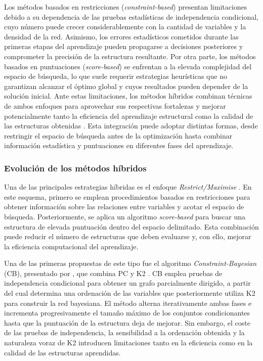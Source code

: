 Los métodos basados en restricciones (\textit{constraint-based}) presentan limitaciones debido a su dependencia de las pruebas estadísticas de independencia condicional, cuyo número puede crecer considerablemente con la cantidad de variables y la densidad de la red. Asimismo, los errores estadísticos cometidos durante las primeras etapas del aprendizaje pueden propagarse a decisiones posteriores y comprometer la precisión de la estructura resultante. Por otra parte, los métodos basados en puntuaciones (\textit{score-based}) se enfrentan a la elevada complejidad del espacio de búsqueda, lo que suele requerir estrategias heurísticas que no garantizan alcanzar el óptimo global y cuyos resultados pueden depender de la solución inicial. Ante estas limitaciones, los métodos híbridos combinan técnicas de ambos enfoques para aprovechar sus respectivas fortalezas y mejorar potencialmente tanto la eficiencia del aprendizaje estructural como la calidad de las estructuras obtenidas \citep{kitson2023survey}. Esta integración puede adoptar distintas formas, desde restringir el espacio de búsqueda antes de la optimización hasta combinar información estadística y puntuaciones en diferentes fases del aprendizaje.

\subsubsection{Evolución de los métodos híbridos}

Una de las principales estrategias híbridas es el enfoque \textit{Restrict/Maximise} \citep{kitson2023survey}. En este esquema, primero se emplean procedimientos basados en restricciones para obtener información sobre las relaciones entre variables y acotar el espacio de búsqueda. Posteriormente, se aplica un algoritmo \textit{score-based} para buscar una estructura de elevada puntuación dentro del espacio delimitado. Esta combinación puede reducir el número de estructuras que deben evaluarse y, con ello, mejorar la eficiencia computacional del aprendizaje.

Una de las primeras propuestas de este tipo fue el algoritmo \textit{Constraint-Bayesian} (CB), presentado por \citet{SINGH1993259}, que combina PC y K2 \citep{Cooper1992K2}. CB emplea pruebas de independencia condicional para obtener un grafo parcialmente dirigido, a partir del cual determina una ordenación de las variables que posteriormente utiliza K2 para construir la red bayesiana. El método alterna iterativamente ambas fases e incrementa progresivamente el tamaño máximo de los conjuntos condicionantes hasta que la puntuación de la estructura deja de mejorar. Sin embargo, el coste de las pruebas de independencia, la sensibilidad a la ordenación obtenida y la naturaleza voraz de K2 introducen limitaciones tanto en la eficiencia como en la calidad de las estructuras aprendidas.

